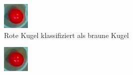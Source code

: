 \begin{figure}[h!]
        \centering
        \begin{subfigure}[b]{0.2\textwidth}
                \centering
                \includegraphics[width=1.0\linewidth]{../common/04_results/resources/classification/failed_classification_BROWN_RED_5_original.png}
                \caption{Rote Kugel klassifiziert als braune Kugel}
                \label{fig:classification_results_failed_classification_BROWN_RED_5_original}
        \end{subfigure}
        \hfill
        \begin{subfigure}[b]{0.2\textwidth}
                \raggedright
                \includegraphics[width=1.0\linewidth]{../common/04_results/resources/classification/failed_classification_BROWN_RED_11_original.png}

\end{subfigure}
\end{figure}
